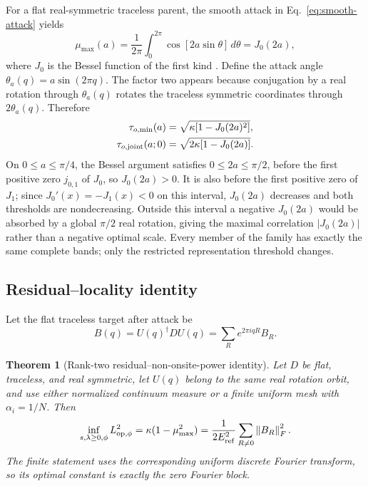 \documentclass[11pt]{article}
\newtheorem{theorem}{Theorem}
\theoremstyle{definition}
\newcommand{\norm}[1]{\left\lVert#1\right\rVert}
\begin{document}
For a flat real-symmetric traceless parent, the smooth attack in
Eq.~\eqref{eq:smooth-attack} yields
\begin{equation}
 \mu_{\max}(a)=\frac{1}{2\pi}\int_0^{2\pi}
 \cos[2a\sin\theta]\,d\theta=J_0(2a),
 \label{eq:bessel-correlation}
\end{equation}
where $J_0$ is the Bessel function of the first kind \cite{dlmf1012}.  Define the attack angle $\theta_a(q)=a\sin(2\pi q)$.  The factor two appears because
conjugation by a real rotation through $\theta_a(q)$ rotates the traceless symmetric
coordinates through $2\theta_a(q)$.  Therefore
\begin{align}
 \tau_{o,\min}(a)
 &=\sqrt{\kappa[1-J_0(2a)^2]},\label{eq:min-threshold}\\
 \tau_{o,\rm joint}(a;0)
 &=\sqrt{2\kappa[1-J_0(2a)]}.
 \label{eq:joint-threshold}
\end{align}
On $0\le a\le\pi/4$, the Bessel argument satisfies $0\le2a\le\pi/2$, before the
first positive zero $j_{0,1}$ of $J_0$, so $J_0(2a)>0$.  It is also before the first
positive zero of $J_1$; since $J_0'(x)=-J_1(x)<0$ on this interval, $J_0(2a)$ decreases
and both thresholds are nondecreasing.  Outside this interval a negative $J_0(2a)$ would
be absorbed by a global $\pi/2$ real rotation, giving the maximal correlation
$|J_0(2a)|$ rather than a negative optimal scale.  Every member of the family
has exactly the same complete bands; only the restricted representation threshold
changes.

\subsection{Residual--locality identity}

Let the flat traceless target after attack be
\begin{equation}
 B(q)=U(q)^\dagger D U(q)=\sum_R e^{2\pi iqR}B_R.
\end{equation}

\begin{theorem}[Rank-two residual--non-onsite-power identity]
Let $D$ be flat, traceless, and real symmetric, let $U(q)$ belong to the same real
rotation orbit, and use either normalized continuum measure or a finite uniform mesh
with $\alpha_i=1/N$.  Then
\begin{equation}
 \inf_{s,\lambda\ge0,\phi}L_{\rm op,\phi}^2
 =\kappa(1-\mu_{\max}^2)
 =\frac{1}{2E_{\rm ref}^2}\sum_{R\ne0}\norm{B_R}_F^2.
 \label{eq:residual-tail-identity}
\end{equation}
The finite statement uses the corresponding uniform discrete Fourier transform, so its
optimal constant is exactly the zero Fourier block.
\end{theorem}
\end{document}
